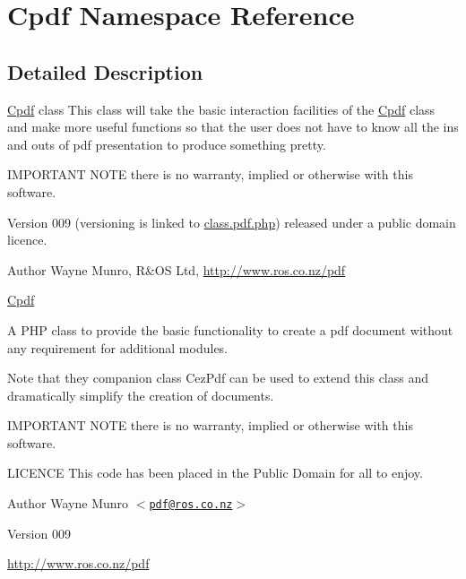 \hypertarget{namespace_cpdf}{\section{\-Cpdf \-Namespace \-Reference}
\label{namespace_cpdf}
}


\subsection{\-Detailed \-Description}
\hyperlink{class_cpdf}{\-Cpdf} class \-This class will take the basic interaction facilities of the \hyperlink{class_cpdf}{\-Cpdf} class and make more useful functions so that the user does not have to know all the ins and outs of pdf presentation to produce something pretty.

\-I\-M\-P\-O\-R\-T\-A\-N\-T \-N\-O\-T\-E there is no warranty, implied or otherwise with this software.

\begin{DoxyVersion}{\-Version}
009 (versioning is linked to \hyperlink{class_8pdf_8php}{class.\-pdf.\-php}) released under a public domain licence. 
\end{DoxyVersion}
\begin{DoxyAuthor}{\-Author}
\-Wayne \-Munro, \-R\&\-O\-S \-Ltd, \hyperlink{}{http\-://www.\-ros.\-co.\-nz/pdf}
\end{DoxyAuthor}
\hyperlink{class_cpdf}{\-Cpdf}

\-A \-P\-H\-P class to provide the basic functionality to create a pdf document without any requirement for additional modules.

\-Note that they companion class \-Cez\-Pdf can be used to extend this class and dramatically simplify the creation of documents.

\-I\-M\-P\-O\-R\-T\-A\-N\-T \-N\-O\-T\-E there is no warranty, implied or otherwise with this software.

\-L\-I\-C\-E\-N\-C\-E \-This code has been placed in the \-Public \-Domain for all to enjoy.

\begin{DoxyAuthor}{\-Author}
\-Wayne \-Munro $<$\href{mailto:pdf@ros.co.nz}{\tt pdf@ros.\-co.\-nz}$>$ 
\end{DoxyAuthor}
\begin{DoxyVersion}{\-Version}
009
\end{DoxyVersion}
\hyperlink{}{http\-://www.\-ros.\-co.\-nz/pdf}